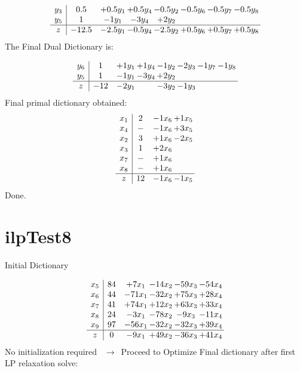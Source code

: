 \documentclass[11pt]{article}
\begin{document}
\[\begin{array}{c| c c@{\hskip 2pt} c@{\hskip 2pt} c@{\hskip 2pt} c@{\hskip 2pt} c@{\hskip 2pt} c@{\hskip 2pt} }
 y_{3}   &  0.5 & + 0.5 y_{1} & + 0.5 y_{4} & -0.5 y_{2} & -0.5 y_{6} & -0.5 y_{7} & -0.5 y_{8}\\
 y_{5}   &  1 & -1 y_{1} & -3 y_{4} & + 2 y_{2} &    &    &   \\
\hline
z    &  -12.5 & -2.5 y_{1} & -0.5 y_{4} & -2.5 y_{2} & + 0.5 y_{6} & + 0.5 y_{7} & + 0.5 y_{8}\\
\end{array}\]
The Final Dual Dictionary is: 

\[\begin{array}{c| c c@{\hskip 2pt} c@{\hskip 2pt} c@{\hskip 2pt} c@{\hskip 2pt} c@{\hskip 2pt} c@{\hskip 2pt} }
 y_{6}   &  1 & + 1 y_{1} & + 1 y_{4} & -1 y_{2} & -2 y_{3} & -1 y_{7} & -1 y_{8}\\
 y_{5}   &  1 & -1 y_{1} & -3 y_{4} & + 2 y_{2} &    &    &   \\
\hline
z    &  -12 & -2 y_{1} &   & -3 y_{2} & -1 y_{3} &    &   \\
\end{array}\]
 Final primal dictionary obtained: 
\[\begin{array}{c| c c@{\hskip 2pt} c@{\hskip 2pt} }
 x_{1}   &  2 & -1 x_{6} & + 1 x_{5}\\
 x_{4}   &  - & -1 x_{6} & + 3 x_{5}\\
 x_{2}   &  3 & + 1 x_{6} & -2 x_{5}\\
 x_{3}   &  1 & + 2 x_{6} &   \\
 x_{7}   &  - & + 1 x_{6} &   \\
 x_{8}   &  - & + 1 x_{6} &   \\
\hline
z    &  12 & -1 x_{6} & -1 x_{5}\\
\end{array}\]
Done.
\section{ilpTest8}

Initial Dictionary 

\[\begin{array}{c| c c@{\hskip 2pt} c@{\hskip 2pt} c@{\hskip 2pt} c@{\hskip 2pt} }
 x_{5}   &  84 & + 7 x_{1} & -14 x_{2} & -59 x_{3} & -54 x_{4}\\
 x_{6}   &  44 & -71 x_{1} & -32 x_{2} & + 75 x_{3} & + 28 x_{4}\\
 x_{7}   &  41 & + 74 x_{1} & + 12 x_{2} & + 63 x_{3} & + 33 x_{4}\\
 x_{8}   &  24 & -3 x_{1} & -78 x_{2} & -9 x_{3} & -11 x_{4}\\
 x_{9}   &  97 & -56 x_{1} & -32 x_{2} & -32 x_{3} & + 39 x_{4}\\
\hline
z    &  0 & -9 x_{1} & + 49 x_{2} & -36 x_{3} & + 41 x_{4}\\
\end{array}\]
No initialization required \ $\rightarrow$\  Proceed to Optimize 
Final dictionary after first LP relaxation solve: 
\end{document}
